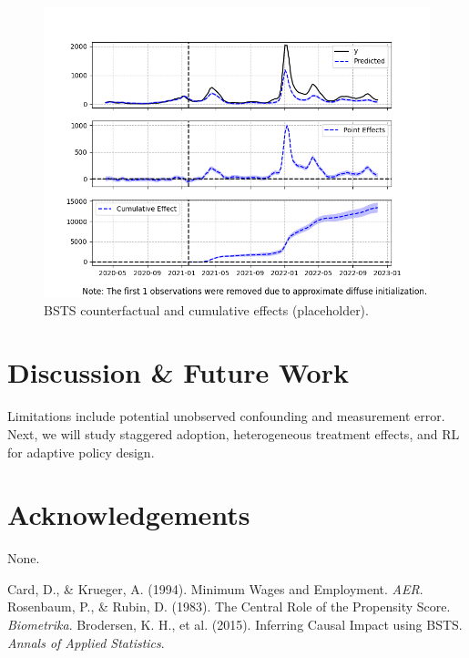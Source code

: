\documentclass[10pt]{article}
\begin{document}
\begin{multicols}{2}
\begin{figure}[H]
\centering
\includegraphics[width=\linewidth]{../figures/fig3_bsts_counterfactual.png}
\caption{BSTS counterfactual and cumulative effects (placeholder).}
\label{fig:bsts}
\end{figure}

\section{Discussion \& Future Work}
Limitations include potential unobserved confounding and measurement error. Next, we will study staggered adoption, heterogeneous treatment effects, and RL for adaptive policy design.

\section*{Acknowledgements}
None.

\begin{thebibliography}{9}
 Card, D., \& Krueger, A. (1994). Minimum Wages and Employment. \textit{AER}.
 Rosenbaum, P., \& Rubin, D. (1983). The Central Role of the Propensity Score. \textit{Biometrika}.
 Brodersen, K. H., et al. (2015). Inferring Causal Impact using BSTS. \textit{Annals of Applied Statistics}.
\end{thebibliography}

\end{multicols}
\end{document}

